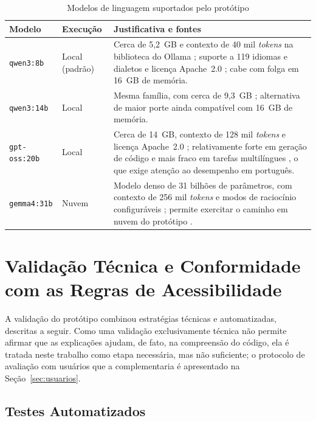 \documentclass[
    12pt,                   %
    openright,              %
    oneside,                %
    a4paper,                %
    sumario=tradicional,    %
    english,                %
    brazil,                 %
    ]{abntex2}
\begin{document}
\begin{table}[htbp]
  \centering
  \caption{Modelos de linguagem suportados pelo protótipo}
  \label{tab:modelos}
  \begin{tabular}{p{2.5cm}p{2.2cm}p{7.6cm}}
    \toprule
    \textbf{Modelo} & \textbf{Execução} & \textbf{Justificativa e fontes} \\
    \midrule
    \texttt{qwen3:8b} & Local (padrão) & Cerca de 5,2~GB e contexto de 40 mil \textit{tokens} na biblioteca do Ollama \cite{ollama2026qwen3}; suporte a 119 idiomas e dialetos e licença Apache~2.0 \cite{yang2025qwen3}; cabe com folga em 16~GB de memória. \\
    \texttt{qwen3:14b} & Local & Mesma família, com cerca de 9,3~GB \cite{ollama2026qwen3}; alternativa de maior porte ainda compatível com 16~GB de memória. \\
    \texttt{gpt-oss:20b} & Local & Cerca de 14~GB, contexto de 128 mil \textit{tokens} e licença Apache~2.0 \cite{ollama2026gptoss}; relativamente forte em geração de código e mais fraco em tarefas multilíngues \cite{bi2025gptoss}, o que exige atenção ao desempenho em português. \\
    \texttt{gemma4:31b} & Nuvem & Modelo denso de 31 bilhões de parâmetros, com contexto de 256 mil \textit{tokens} e modos de raciocínio configuráveis \cite{ollama2026gemma4}; permite exercitar o caminho em nuvem do protótipo \cite{ollama2026nuvem}. \\
    \bottomrule
  \end{tabular}
\end{table}

\section{Validação Técnica e Conformidade com as Regras de Acessibilidade}\label{sec:validacao}

A validação do protótipo combinou estratégias técnicas e automatizadas, descritas a seguir. Como uma validação exclusivamente técnica não permite afirmar que as explicações ajudam, de fato, na compreensão do código, ela é tratada neste trabalho como etapa necessária, mas não suficiente; o protocolo de avaliação com usuários que a complementaria é apresentado na Seção~\ref{sec:usuarios}.

\subsection{Testes Automatizados}
\end{document}
